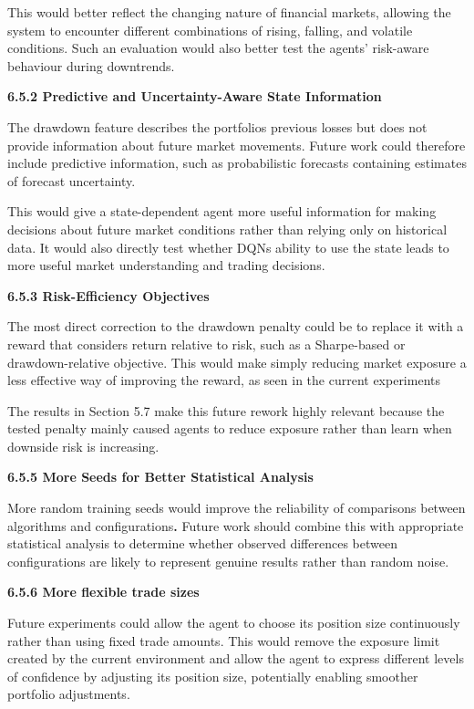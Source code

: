 This would better reflect the changing nature of financial markets,
allowing the system to encounter different combinations of rising,
falling, and volatile conditions. Such an evaluation would also better
test the agents' risk-aware behaviour during downtrends.

\textbf{6.5.2 Predictive and Uncertainty-Aware State Information}

The drawdown feature describes the portfolio\textquotesingle s previous
losses but does not provide information about future market movements.
Future work could therefore include predictive information, such as
probabilistic forecasts containing estimates of forecast uncertainty.

This would give a state-dependent agent more useful information for
making decisions about future market conditions rather than relying only
on historical data. It would also directly test whether
DQN\textquotesingle s ability to use the state leads to more useful
market understanding and trading decisions.

\textbf{6.5.3 Risk-Efficiency Objectives}

The most direct correction to the drawdown penalty could be to replace
it with a reward that considers return relative to risk, such as a
Sharpe-based or drawdown-relative objective. This would make simply
reducing market exposure a less effective way of improving the reward,
as seen in the current experiments

The results in Section 5.7 make this future rework highly relevant
because the tested penalty mainly caused agents to reduce exposure
rather than learn when downside risk is increasing.

\textbf{6.5.5 More Seeds for Better Statistical Analysis}

More random training seeds would improve the reliability of comparisons
between algorithms and configurations\textbf{.} Future work should
combine this with appropriate statistical analysis to determine whether
observed differences between configurations are likely to represent
genuine results rather than random noise.

\textbf{6.5.6 More flexible trade sizes}

Future experiments could allow the agent to choose its position size
continuously rather than using fixed trade amounts. This would remove
the exposure limit created by the current environment and allow the
agent to express different levels of confidence by adjusting its
position size, potentially enabling smoother portfolio adjustments.

